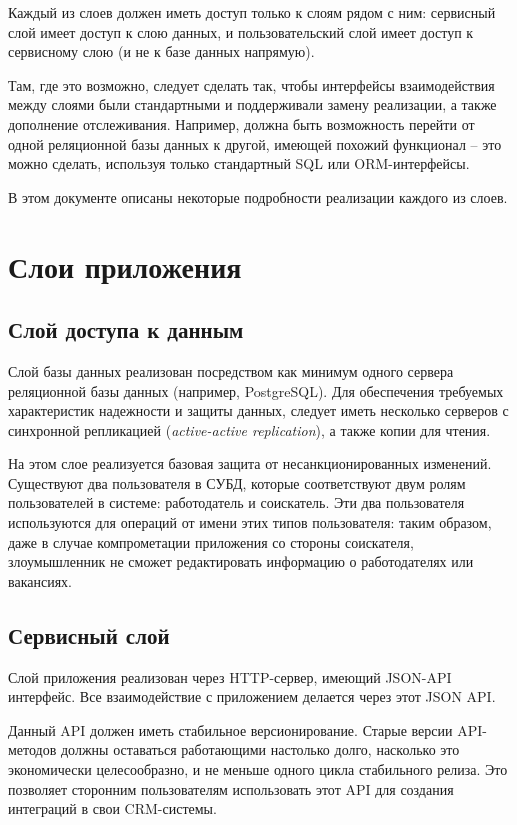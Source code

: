 \documentclass[a4page]{article}
\begin{document}
Каждый из слоев должен иметь доступ только к слоям рядом с ним:
сервисный слой имеет доступ к слою данных,
и пользовательский слой имеет доступ к сервисному слою
(и не к базе данных напрямую).

Там, где это возможно, следует сделать так, чтобы интерфейсы взаимодействия между слоями
были стандартными и поддерживали замену реализации, а также дополнение отслеживания.
Например, должна быть возможность перейти от одной реляционной базы данных к другой,
имеющей похожий функционал --
это можно сделать, используя только стандартный SQL или ORM-интерфейсы.

В этом документе описаны некоторые подробности реализации каждого из слоев. 

\newpage
\section{Слои приложения}

\subsection{Слой доступа к данным}

Слой базы данных реализован посредством как минимум
одного сервера реляционной базы данных (например, PostgreSQL).
Для обеспечения требуемых характеристик надежности и защиты данных,
следует иметь несколько серверов с синхронной репликацией (\textit{active-active replication}),
а также копии для чтения.

На этом слое реализуется базовая защита от несанкционированных изменений.
Существуют два пользователя в СУБД, которые соответствуют двум ролям пользователей в системе:
работодатель и соискатель.
Эти два пользователя используются для операций от имени этих типов пользователя:
таким образом, даже в случае компрометации приложения со стороны соискателя,
злоумышленник не сможет редактировать информацию о работодателях или вакансиях.

\subsection{Сервисный слой}

Слой приложения реализован через HTTP-сервер, имеющий JSON-API интерфейс.
Все взаимодействие с приложением делается через этот JSON API.

Данный API должен иметь стабильное версионирование.
Старые версии API-методов должны оставаться работающими
настолько долго, насколько это экономически целесообразно,
и не меньше одного цикла стабильного релиза.
Это позволяет сторонним пользователям использовать этот API
для создания интеграций в свои CRM-системы.
\end{document}
